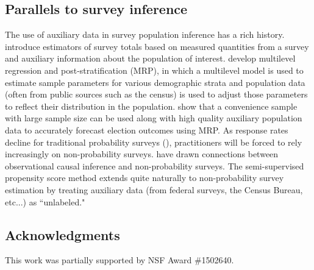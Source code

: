 \documentclass[aos]{imsart}
\begin{document}
\subsection{Parallels to survey inference}

The use of auxiliary data in survey population inference has a rich history. \cite{horvitz1952generalization} 
introduce estimators of survey totals based on measured quantities from a survey and auxiliary information about the population of interest.
\cite{GelmanLittle97} develop multilevel regression and post-stratification (MRP), 
in which a multilevel model is used to estimate sample parameters for various demographic strata and population data 
(often from public sources such as the census) is used to adjust those parameters to reflect their distribution in the population. 
\cite{WANG2015980} show that a convenience sample with large sample size can be used along with 
high quality auxiliary population data to accurately forecast election outcomes using MRP. 
As response rates decline for traditional probability surveys (\cite{kennedy2019response}), 
practitioners will be forced to rely increasingly on non-probability surveys.
\cite{mkks2017} have drawn connections between observational causal inference and non-probability surveys. 
The semi-supervised propensity score method extends quite naturally to non-probability survey estimation 
by treating auxiliary data (from federal surveys, the Census Bureau, etc...) as ``unlabeled."

\subsection{Acknowledgments}

This work was partially supported by NSF Award \#1502640.

 


\end{document}
